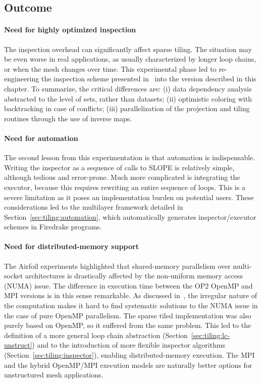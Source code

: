 \subsection{Outcome}
\label{sec:tiling:bench:conc}

\paragraph{Need for highly optimized inspection}
The inspection overhead can significantly affect sparse tiling. The situation may be even worse in real applications, as usually characterized by longer loop chains, or when the mesh changes over time. This experimental phase led to re-engineering the inspection scheme presented in~\cite{st-paper} into the version described in this chapter. To summarize, the critical differences are: (i) data dependency analysis abstracted to the level of sets, rather than datasets; (ii) optimistic coloring with backtracking in case of conflicts; (iii) parallelization of the projection and tiling routines through the use of inverse maps. 

\paragraph{Need for automation}
The second lesson from this experimentation is that automation is indispensable. Writing the inspector as a sequence of calls to SLOPE is relatively simple, although tedious and error-prone. Much more complicated is integrating the executor, because this requires rewriting an entire sequence of loops. This is a severe limitation as it poses an implementation burden on potential users. These considerations led to the multilayer framework detailed in Section~\ref{sec:tiling:automation}, which automatically generates inspector/executor schemes in Firedrake programs. 

\paragraph{Need for distributed-memory support}
The Airfoil experiments highlighted that shared-memory parallelism over multi-socket architectures is drastically affected by the non-uniform memory access (NUMA) issue. The difference in execution time between the OP2 OpenMP and MPI versions is in this sense remarkable. As discussed in~\cite{hydra-op2}, the irregular nature of the computation makes it hard to find systematic solutions to the NUMA issue in the case of pure OpenMP parallelism. The sparse tiled implementation was also purely based on OpenMP, so it suffered from the same problem. This led to the definition of a more general loop chain abstraction (Section~\ref{sec:tiling:lc-unstruct}) and to the introduction of more flexible inspector algorithms (Section~\ref{sec:tiling:inspector}), enabling distributed-memory execution. The MPI and the hybrid OpenMP/MPI execution models are naturally better options for unstructured mesh applications. 

